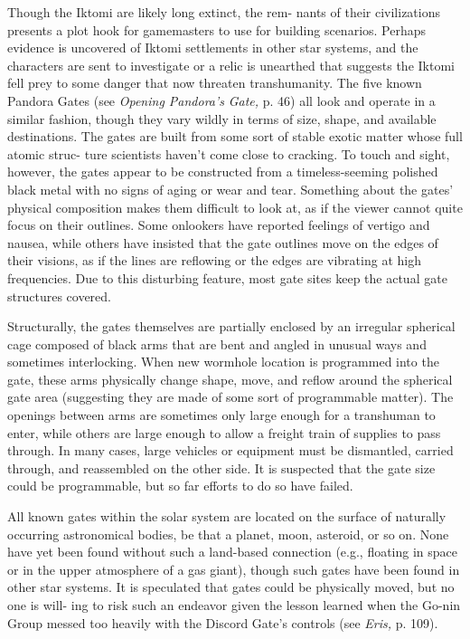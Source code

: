 Though the Iktomi are likely long extinct, the rem-
nants of their civilizations presents a plot hook for 
gamemasters to use for building scenarios. Perhaps 
evidence is uncovered of Iktomi settlements in other 
star systems, and the characters are sent to investigate 
or a relic is unearthed that suggests the Iktomi fell 
prey to some danger that now threaten transhumanity. 
The five known Pandora Gates (see \textit{Opening Pandora's }
\textit{Gate,} p. 46) all look and operate in a similar fashion, 
though they vary wildly in terms of size, shape, and 
available destinations. The gates are built from some 
sort of stable exotic matter whose full atomic struc-
ture scientists haven't come close to cracking. To touch 
and sight, however, the gates appear to be constructed 
from a timeless-seeming polished black metal with no 
signs of aging or wear and tear. Something about the 
gates' physical composition makes them difficult to 
look at, as if the viewer cannot quite focus on their 
outlines. Some onlookers have reported feelings of 
vertigo and nausea, while others have insisted that the 
gate outlines move on the edges of their visions, as if 
the lines are reflowing or the edges are vibrating at 
high frequencies. Due to this disturbing feature, most 
gate sites keep the actual gate structures covered.

Structurally, the gates themselves are partially 
enclosed by an irregular spherical cage composed of 
black arms that are bent and angled in unusual ways 
and sometimes interlocking. When new wormhole 
location is programmed into the gate, these arms 
physically change shape, move, and reflow  around 
the spherical gate area (suggesting they are made of 
some sort of programmable matter). The openings 
between arms are sometimes only large enough for 
a transhuman to enter, while others are large enough 
to allow a freight train of supplies to pass through. 
In many cases, large vehicles or equipment must be 
dismantled, carried through, and reassembled on the 
other side. It is suspected that the gate size could be 
programmable, but so far efforts to do so have failed.

All known gates within the solar system are located 
on the surface of naturally occurring astronomical 
bodies, be that a planet, moon, asteroid, or so on. 
None have yet been found without such a land-based 
connection (e.g., floating in space or in the upper 
atmosphere of a gas giant), though such gates have 
been found in other star systems. It is speculated that 
gates could be physically moved, but no one is will-
ing to risk such an endeavor given the lesson learned 
when the Go-nin Group messed too heavily with the 
Discord Gate's controls (see \textit{Eris, }p. 109).

